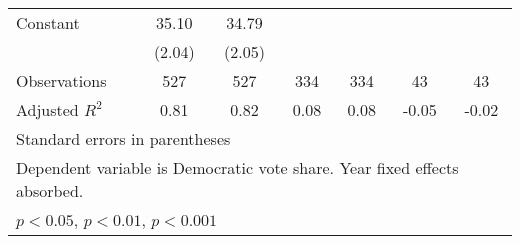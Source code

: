 \begin{table}[htbp]
\begin{tabular}{l*{6}{c}}
\addlinespace
Constant            &       35.10\sym{***}&       34.79\sym{***}&                     &                     &                     &                     \\
                    &      (2.04)         &      (2.05)         &                     &                     &                     &                     \\
\midrule
Observations        &         527         &         527         &         334         &         334         &          43         &          43         \\
Adjusted \(R^{2}\)  &        0.81         &        0.82         &        0.08         &        0.08         &       -0.05         &       -0.02         \\
\bottomrule
\multicolumn{7}{l}{\footnotesize Standard errors in parentheses}\\
\multicolumn{7}{l}{\footnotesize Dependent variable is Democratic vote share. Year fixed effects absorbed.}\\
\multicolumn{7}{l}{\footnotesize \sym{*} \(p<0.05\), \sym{**} \(p<0.01\), \sym{***} \(p<0.001\)}\\
\end{tabular}
\end{table}

